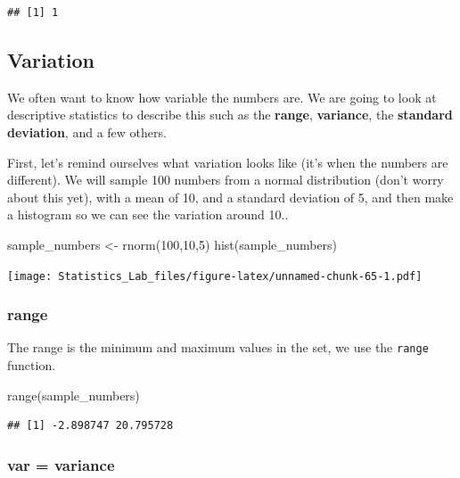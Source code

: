 \documentclass[
]{book}
\newenvironment{Shaded}{\begin{snugshade}}{\end{snugshade}}
\newcommand{\DecValTok}[1]{\textcolor[rgb]{0.00,0.00,0.81}{#1}}
\newcommand{\FunctionTok}[1]{\textcolor[rgb]{0.00,0.00,0.00}{#1}}
\newcommand{\NormalTok}[1]{#1}
\newcommand{\OtherTok}[1]{\textcolor[rgb]{0.56,0.35,0.01}{#1}}
\begin{document}
\begin{verbatim}
## [1] 1
\end{verbatim}

\hypertarget{variation}{%
\subsection{Variation}\label{variation}}

We often want to know how variable the numbers are. We are going to look at descriptive statistics to describe this such as the \textbf{range}, \textbf{variance}, the \textbf{standard deviation}, and a few others.

First, let's remind ourselves what variation looks like (it's when the numbers are different). We will sample 100 numbers from a normal distribution (don't worry about this yet), with a mean of 10, and a standard deviation of 5, and then make a histogram so we can see the variation around 10..

\begin{Shaded}
\begin{Highlighting}[]
\NormalTok{sample\_numbers }\OtherTok{\textless{}{-}} \FunctionTok{rnorm}\NormalTok{(}\DecValTok{100}\NormalTok{,}\DecValTok{10}\NormalTok{,}\DecValTok{5}\NormalTok{)}
\FunctionTok{hist}\NormalTok{(sample\_numbers)}
\end{Highlighting}
\end{Shaded}

\texttt{[image: Statistics\_Lab\_files/figure-latex/unnamed-chunk-65-1.pdf]}

\hypertarget{range}{%
\subsubsection{range}\label{range}}

The range is the minimum and maximum values in the set, we use the \texttt{range} function.

\begin{Shaded}
\begin{Highlighting}[]
\FunctionTok{range}\NormalTok{(sample\_numbers)}
\end{Highlighting}
\end{Shaded}

\begin{verbatim}
## [1] -2.898747 20.795728
\end{verbatim}

\hypertarget{var-variance}{%
\subsubsection{var = variance}\label{var-variance}}
\end{document}
